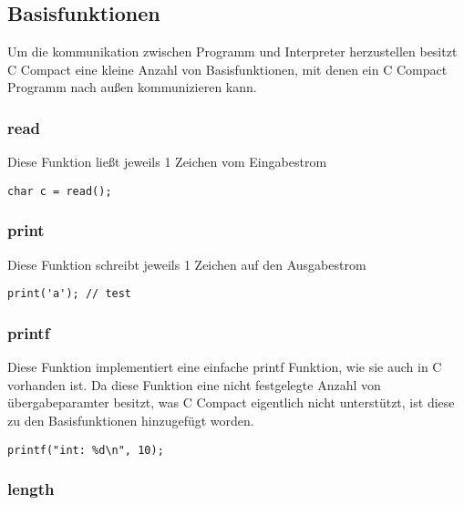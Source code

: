 
\subsection{Basisfunktionen}

Um die kommunikation zwischen Programm und Interpreter herzustellen besitzt C Compact eine kleine Anzahl von Basisfunktionen, mit denen ein C Compact Programm nach außen kommunizieren kann.

\subsubsection{read}

Diese Funktion ließt jeweils 1 Zeichen vom Eingabestrom

\begin{lstlisting}[language=CMM]
char c = read();
\end{lstlisting}

\subsubsection{print}

Diese Funktion schreibt jeweils 1 Zeichen auf den Ausgabestrom

\begin{lstlisting}[language=CMM]
print('a'); // test
\end{lstlisting}

\subsubsection{printf}

Diese Funktion implementiert eine einfache printf Funktion, wie sie auch in C vorhanden  ist. Da diese Funktion eine nicht festgelegte Anzahl von \"ubergabeparamter besitzt, was C Compact eigentlich nicht unterst\"utzt, ist diese zu den Basisfunktionen hinzugef\"ugt worden.

\begin{lstlisting}[language=CMM]
printf("int: %d\n", 10);
\end{lstlisting}

\subsubsection{length}

